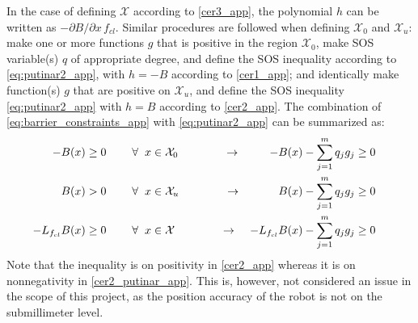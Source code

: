 In the case of defining $\mathcal{X}$ according to \autoref{cer3_app}, the polynomial $h$ can be written as $-\partial B/\partial x \, f_{cl}$.
Similar procedures are followed when defining $\mathcal{X}_0$ and $\mathcal{X}_u$: make one or more functions $g$ that is positive in the region $\mathcal{X}_0$, make SOS variable(s) $q$ of appropriate degree, and define the SOS inequality according to \autoref{eq:putinar2_app}, with $h=-B$ according to \autoref{cer1_app}; and identically make function(s) $g$ that are positive on $\mathcal{X}_u$, and define the SOS inequality \autoref{eq:putinar2_app} with $h=B$ according to \autoref{cer2_app}. The combination of \autoref{eq:barrier_constraints_app} with \autoref{eq:putinar2_app} can be summarized as:
\begin{subequations}\label{eq:barrier_constraints_putinar_app}
\begin{flalign}
-B(x) &\geq 0 \hspace{0.8cm}  \forall \hspace{2mm} x \in \mathcal{X}_0 \qquad\qquad \rightarrow& 
	-B(x) - \sum _{j=1}^{m}q_jg_j &\geq 0 && \label{cer1_putinar_app}\\
B(x) &> 0 \hspace{0.8cm}  \forall \hspace{2mm} x \in \mathcal{X}_u \qquad\qquad \rightarrow& 
	B(x) - \sum _{j=1}^{m}q_jg_j &\geq 0 &&\label{cer2_putinar_app} \\
-L_{f_{cl}}B(x) &\geq 0 \hspace{0.8cm}  \forall \hspace{2mm} x \in \mathcal{X} \qquad\qquad \rightarrow& 
	-L_{f_{cl}}B(x) - \sum _{j=1}^{m}q_jg_j &\geq 0 && \label{cer3_putinar_app}
\end{flalign}
\end{subequations}
Note that the inequality is on positivity in \autoref{cer2_app} whereas it is on nonnegativity in \autoref{cer2_putinar_app}. This is, however, not considered an issue in the scope of this project, as the position accuracy of the robot is not on the submillimeter level.

